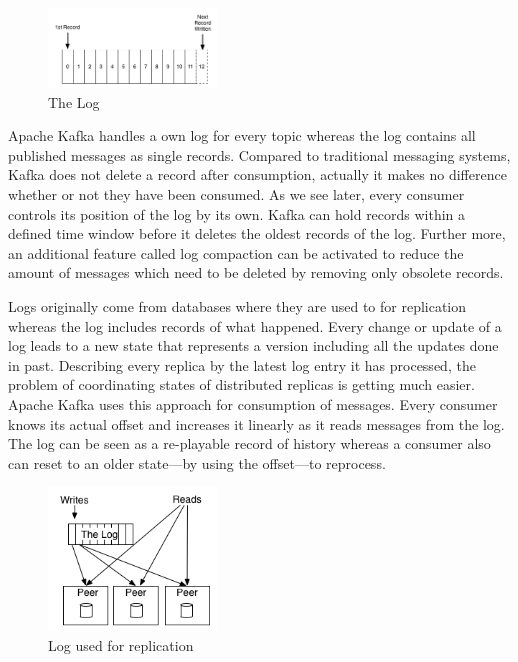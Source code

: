\begin{figure}[H]
    \centering
    \includegraphics[width=0.4\textwidth]{images/log.png}
    \caption{The  Log \cite{JK-TheLog}}
    \label{fig:the-log}
\end{figure}

Apache Kafka handles a own log for every topic whereas the log contains all
published messages as single records. Compared to traditional messaging systems,
Kafka does not delete a record after consumption, actually it makes no difference
 whether or not they have been consumed. As we see later, every consumer
controls its position of the log by its own. Kafka can hold records within a
defined time window before it deletes the oldest records of the log.
Further more, an additional feature called log compaction can be activated to reduce the amount of messages
which need to be deleted by removing only obsolete records. \cite{apachekafka} \cite{JK-TheLog}

Logs originally come from databases where they are used to for replication
whereas the log includes records of what happened. Every change or update of a
log leads to a new state that represents a version including all the updates
done in past. Describing every replica by the latest log entry it has processed, 
the problem of coordinating states of distributed replicas is getting much easier.
Apache Kafka uses this approach for consumption of messages. Every consumer knows its actual offset and
increases it linearly as it reads messages from the log. The log can be seen as a
re-playable record of history whereas a consumer also can reset to an older
state---by using the offset---to reprocess. \cite{JK-TheLog}

\begin{figure}[H]
    \centering
    \includegraphics[width=0.4\textwidth]{images/state-machine-replication.png}
    \caption{Log used for replication \cite{JK-TheLog}}
    \label{fig:the-log}
\end{figure}

